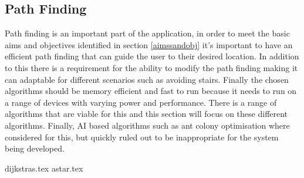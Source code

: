\subsection{Path Finding}
Path finding is an important part of the application, in order to meet the basic aims and objectives identified in section \ref{aimssandobj} it's important to have an efficient path finding that can guide the user to their desired location. In addition to this there is a requirement for the ability to modify the path finding making it can adaptable for different scenarios such as avoiding stairs. Finally the chosen algorithms should be memory efficient and fast to run because it needs to run on a range of devices with varying power and performance. There is a range of algorithms that are viable for this and this section will focus on these different algorithms. Finally, AI based algorithms such as ant colony optimisation where considered for this, but quickly ruled out to be inappropriate for the system being developed.

{dijkstras.tex}
{astar.tex}